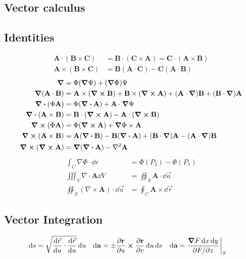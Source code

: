 \documentclass[8pt]{extarticle}
\newcommand{\A}{{\mathbf{A}}}
\newcommand{\B}{{\mathbf{B}}}
\newcommand{\C}{{\mathbf{C}}}
\begin{document}
\begin{multicols*}{3}
\section{Vector calculus}
\subsection{Identities}
\begin{align*}
    \A\cdot(\B\times\C) &= \B\cdot(\C\times\A) = \C\cdot(\A\times\B) \\
    \A\times(\B\times\C) &= \B(\A\cdot\C) - \C(\A\cdot\B)
\end{align*}
\begin{align*}
    \grad &= \Phi(\grad\Psi) + (\grad\Phi)\Psi\\
    \grad(\A \cdot \B) &= \A \times (\curl \B) + \B \times (\curl \A) + (\A \cdot
    \grad)\B + (\B \cdot \grad)\A \\
    \div (\Phi \A) &= \Phi(\div \A) + \A \cdot \grad \Phi\\
    \div (\A \times \B) &= \B \cdot (\curl \A) -
        \A \cdot (\curl \B) \\
    \curl (\Phi\A) &= \Phi(\curl \A) + \grad\Phi \times \A \\
    \curl (\A \times \B) &= \A(\div \B) - \B(\div \A) +
    (\B\cdot\grad)\A - (\A\cdot\grad)\B \\
    \curl (\curl \A) &= \grad(\div \A) - \laplacian \A
\end{align*}
\begin{align*}
    \int_{C}\nabla\Phi\cdot\dd{r} &= \Phi(P_2) - \Phi(P_1) \\
    \iiint_{V} \nabla\cdot\A \dd{V} &= \oiint_{S} \A\cdot\dd{\vec{a}} \\
    \oiint_{S} (\nabla\times\A)\cdot \dd{\vec{a}}&= \oint_{C}
    \A\times\dd{\vec{r}}
\end{align*}

\subsection{Vector Integration}

\begin{align*}
    \dd{s} &=\sqrt{\dv{\vec{r}}{u} \cdot \dv{\vec{r}}{u}}\dd{u} &
    \dd{\vb{a}} &= \pm \pdv{\vb{r}}{u} \cross \pdv{\vb{r}}{v} \dd{u}\dd{v} &
    \dd{\vb{a}} &= \frac{\grad F\dd{x}\dd{y}}{\partial F/ \partial z} \eval_S &
\end{align*}


\end{multicols*}
\end{document}
